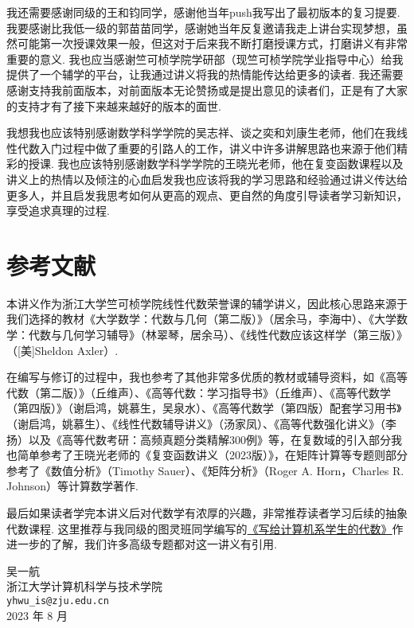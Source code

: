 我还需要感谢同级的王和钧同学，感谢他当年push我写出了最初版本的复习提要. 我要感谢比我低一级的郭苗苗同学，感谢她当年反复邀请我走上讲台实现梦想，虽然可能第一次授课效果一般，但这对于后来我不断打磨授课方式，打磨讲义有非常重要的意义. 我也应当感谢竺可桢学院学研部（现竺可桢学院学业指导中心）给我提供了一个辅学的平台，让我通过讲义将我的热情能传达给更多的读者. 我还需要感谢支持我前面版本，对前面版本无论赞扬或是提出意见的读者们，正是有了大家的支持才有了接下来越来越好的版本的面世.

我想我也应该特别感谢数学科学学院的吴志祥、谈之奕和刘康生老师，他们在我线性代数入门过程中做了重要的引路人的工作，讲义中许多讲解思路也来源于他们精彩的授课. 我也应该特别感谢数学科学学院的王晓光老师，他在复变函数课程以及讲义上的热情以及倾注的心血启发我也应该将我的学习思路和经验通过讲义传达给更多人，并且启发我思考如何从更高的观点、更自然的角度引导读者学习新知识，享受追求真理的过程.

\section*{参考文献}

本讲义作为浙江大学竺可桢学院线性代数荣誉课的辅学讲义，因此核心思路来源于我们选择的教材《大学数学：代数与几何（第二版）》（居余马，李海中）、《大学数学：代数与几何学习辅导》（林翠琴，居余马）、《线性代数应该这样学（第三版）》（[美]Sheldon Axler）.

在编写与修订的过程中，我也参考了其他非常多优质的教材或辅导资料，如《高等代数（第二版）》（丘维声）、《高等代数：学习指导书》（丘维声）、《高等代数学（第四版）》（谢启鸿，姚慕生，吴泉水）、《高等代数学（第四版）配套学习用书》（谢启鸿，姚慕生）、《线性代数辅导讲义》（汤家凤）、《高等代数强化讲义》（李扬）以及《高等代数考研：高频真题分类精解300例》等，在复数域的引入部分我也简单参考了王晓光老师的《复变函数讲义（2023版）》，在矩阵计算等专题则部分参考了《数值分析》（Timothy Sauer）、《矩阵分析》（Roger A. Horn，Charles R. Johnson）等计算数学著作.

最后如果读者学完本讲义后对代数学有浓厚的兴趣，非常推荐读者学习后续的抽象代数课程. 这里推荐与我同级的图灵班同学编写的\href{https://frightenedfoxcn.github.io/notes/series/alg-for-cs/}{《写给计算机系学生的代数》}作进一步的了解，我们许多高级专题都对这一讲义有引用.

\begin{flushright}
    \kaishu
    吴一航 \\
    浙江大学计算机科学与技术学院 \\
    \verb|yhwu_is@zju.edu.cn| \\
    2023 年 8 月
\end{flushright}
